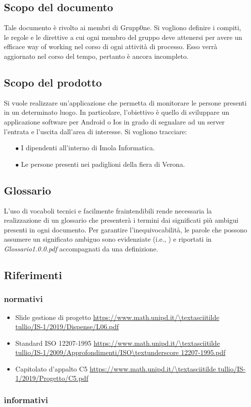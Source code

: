 \documentclass[../norme-di-progetto.tex]{subfiles}
\begin{document}
\subsection{Scopo del documento}
\label{sub:scopo del documento}
Tale documento è rivolto ai membri di Grupp0ne. Si vogliono definire i compiti, le regole e le direttive a cui ogni membro del gruppo deve attenersi per avere un efficace way of working nel corso di ogni attività di processo. Esso verrà aggiornato nel corso del tempo, pertanto è ancora incompleto. 


\subsection{Scopo del prodotto}
\label{sub:scopo del prodotto}
Si vuole realizzare un'applicazione che permetta di monitorare le persone presenti in un determinato luogo. In particolare, l'obiettivo è quello di sviluppare un applicazione software per Android o Ios in grado di segnalare ad un server l'entrata e l'uscita dall'area di interesse.
Si vogliono tracciare:
\begin{itemize}
	\item[$\bullet$]  I dipendenti all'interno di Imola Informatica.
	\item[$\bullet$] Le persone presenti nei padiglioni della fiera di Verona.
\end{itemize}

\subsection{Glossario}
\label{sub:glossario}
L'uso di vocaboli tecnici e facilmente fraintendibili rende necessaria la realizzazione di un glossario che presenterà i termini dai significati più ambigui presenti in ogni documento. Per garantire l'inequivocabilità, le parole che possono assumere un significato ambiguo sono evidenziate (i.e., ) e riportati in \textit{Glossario1.0.0.pdf} accompagnati da una definizione.

\subsection{Riferimenti}
\label{sub:riferimenti}
\subsubsection{normativi}
\label{subs:normativi}
\begin{itemize}
	\item Slide gestione di progetto 
	\newline \url{https://www.math.unipd.it/\textasciitilde tullio/IS-1/2019/Dispense/L06.pdf}
	\item Standard ISO 12207-1995 
	\newline \url{https://www.math.unipd.it/\textasciitilde tullio/IS-1/2009/Approfondimenti/ISO\textunderscore 12207-1995.pdf}
	\item Capitolato d'appalto C5 
	\newline \url{https://www.math.unipd.it/\textasciitilde tullio/IS-1/2019/Progetto/C5.pdf}
\end{itemize}
\subsubsection{informativi}
\label{subs:riferimenti informativi}
\end{document}
